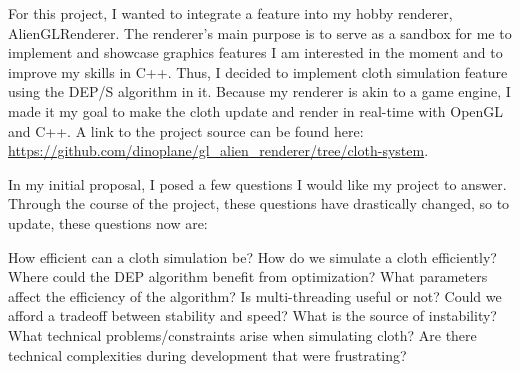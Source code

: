 \documentclass[letterpaper, 10 pt, conference]{ieeeconf}  %
\begin{document}


For this project, I wanted to integrate a feature into my hobby renderer, AlienGLRenderer. The renderer's main purpose is to serve as a sandbox for me to implement and showcase graphics features I am interested in the moment and to improve my skills in C++. Thus, I decided to  implement cloth simulation feature using the DEP/S algorithm in it. Because my renderer is akin to a game engine, I made it my goal to make the cloth update and render in real-time with OpenGL and C++. A link to the project source can be found here: \url{https://github.com/dinoplane/gl_alien_renderer/tree/cloth-system}.

In my initial proposal, I posed a few questions I would like my project to answer. Through the course of the project, these questions have drastically changed, so to update, these questions now are:
\begin{outline}[enumerate]
        \1 How efficient can a cloth simulation be?
        \1 How do we simulate a cloth efficiently?
                \2 Where could the DEP algorithm benefit from optimization?
                        \3 What parameters affect the efficiency of the algorithm?
                \2 Is multi-threading useful or not?
                \2 Could we afford a tradeoff between stability and speed? 
                \2 What is the source of instability?
        \1 What technical problems/constraints arise when simulating cloth?
                \2 Are there technical complexities during development that were frustrating?
\end{outline}
\end{document}
